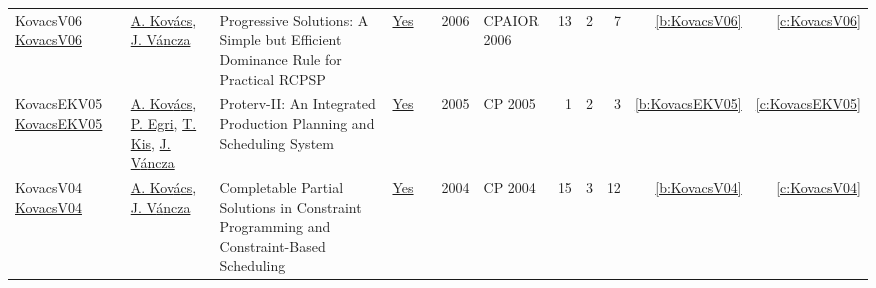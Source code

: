 {\begin{longtable}{>{\raggedright\arraybackslash}p{3cm}>{\raggedright\arraybackslash}p{6cm}>{\raggedright\arraybackslash}p{6.5cm}rrrp{2.5cm}rrrrr}
KovacsV06 \href{https://doi.org/10.1007/11757375\_13}{KovacsV06} & \hyperref[auth:a147]{A. Kov{\'{a}}cs}, \hyperref[auth:a281]{J. V{\'{a}}ncza} & Progressive Solutions: {A} Simple but Efficient Dominance Rule for Practical {RCPSP} & \href{../works/KovacsV06.pdf}{Yes} & \cite{KovacsV06} & 2006 & CPAIOR 2006 & 13 & 2 & 7 & \ref{b:KovacsV06} & \ref{c:KovacsV06}\\
KovacsEKV05 \href{https://doi.org/10.1007/11564751\_118}{KovacsEKV05} & \hyperref[auth:a147]{A. Kov{\'{a}}cs}, \hyperref[auth:a280]{P. Egri}, \hyperref[auth:a157]{T. Kis}, \hyperref[auth:a281]{J. V{\'{a}}ncza} & Proterv-II: An Integrated Production Planning and Scheduling System & \href{../works/KovacsEKV05.pdf}{Yes} & \cite{KovacsEKV05} & 2005 & CP 2005 & 1 & 2 & 3 & \ref{b:KovacsEKV05} & \ref{c:KovacsEKV05}\\
KovacsV04 \href{https://doi.org/10.1007/978-3-540-30201-8\_26}{KovacsV04} & \hyperref[auth:a147]{A. Kov{\'{a}}cs}, \hyperref[auth:a281]{J. V{\'{a}}ncza} & Completable Partial Solutions in Constraint Programming and Constraint-Based Scheduling & \href{../works/KovacsV04.pdf}{Yes} & \cite{KovacsV04} & 2004 & CP 2004 & 15 & 3 & 12 & \ref{b:KovacsV04} & \ref{c:KovacsV04}\\
\end{longtable}
}

\clearpage
